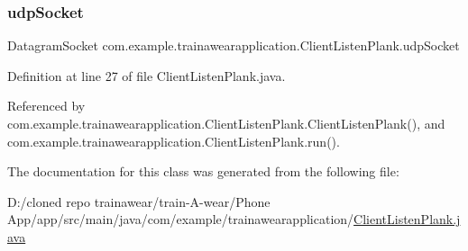 \subsubsection{\texorpdfstring{udpSocket}{udpSocket}}
{\footnotesize\ttfamily Datagram\+Socket com.\+example.\+trainawearapplication.\+Client\+Listen\+Plank.\+udp\+Socket\hspace{0.3cm}{\ttfamily [private]}}



Definition at line 27 of file Client\+Listen\+Plank.\+java.



Referenced by com.\+example.\+trainawearapplication.\+Client\+Listen\+Plank.\+Client\+Listen\+Plank(), and com.\+example.\+trainawearapplication.\+Client\+Listen\+Plank.\+run().



The documentation for this class was generated from the following file\+:\begin{DoxyCompactItemize}
\item 
D\+:/cloned repo trainawear/train-\/\+A-\/wear/\+Phone App/app/src/main/java/com/example/trainawearapplication/\mbox{\hyperlink{_client_listen_plank_8java}{Client\+Listen\+Plank.\+java}}\end{DoxyCompactItemize}
